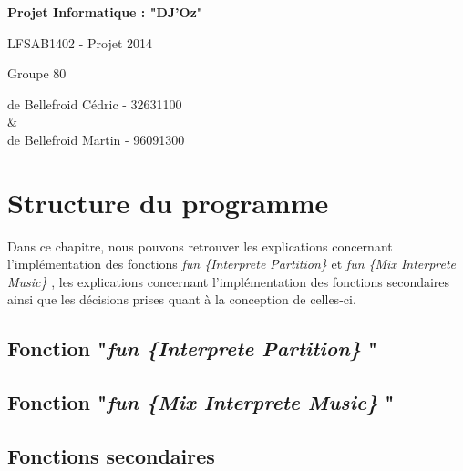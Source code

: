 \documentclass[12pt, a4paper]{report}
\begin{document}
\vspace{5cm}

\begin{center}


\begin{LARGE}
\textbf{Projet Informatique : "DJ'Oz"}
\end{LARGE}
	
\vspace{1cm}

\begin{Large}
\begin{center}

LFSAB1402 - Projet 2014
\vspace{0.5cm}

\end{center}


Groupe 80 

\vspace{0.5cm}
de Bellefroid Cédric - 32631100 \\

\& \\
de Bellefroid Martin - 96091300
\end{Large}

\end{center}
\newpage

\chapter{Structure du programme}
	Dans ce chapitre, nous pouvons retrouver les explications concernant l'implémentation des fonctions \textit{fun \{Interprete Partition\} } et \textit{fun \{Mix Interprete Music\} }, les explications concernant l'implémentation des fonctions secondaires ainsi que les décisions prises quant à la conception de celles-ci.
	
\section{Fonction "\textit{fun \{Interprete Partition\} }"}


\section{Fonction "\textit{fun \{Mix Interprete Music\} }"}


\section{Fonctions secondaires}
\end{document}
